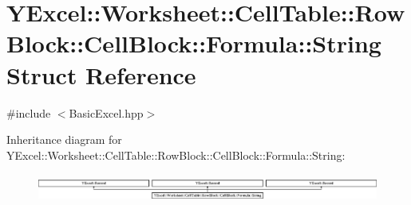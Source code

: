 \hypertarget{struct_y_excel_1_1_worksheet_1_1_cell_table_1_1_row_block_1_1_cell_block_1_1_formula_1_1_string}{}\section{Y\+Excel\+:\+:Worksheet\+:\+:Cell\+Table\+:\+:Row\+Block\+:\+:Cell\+Block\+:\+:Formula\+:\+:String Struct Reference}
\label{struct_y_excel_1_1_worksheet_1_1_cell_table_1_1_row_block_1_1_cell_block_1_1_formula_1_1_string}


{\ttfamily \#include $<$Basic\+Excel.\+hpp$>$}

Inheritance diagram for Y\+Excel\+:\+:Worksheet\+:\+:Cell\+Table\+:\+:Row\+Block\+:\+:Cell\+Block\+:\+:Formula\+:\+:String\+:\begin{figure}[H]
\begin{center}
\leavevmode
\includegraphics[height=0.945148cm]{struct_y_excel_1_1_worksheet_1_1_cell_table_1_1_row_block_1_1_cell_block_1_1_formula_1_1_string}
\end{center}
\end{figure}
